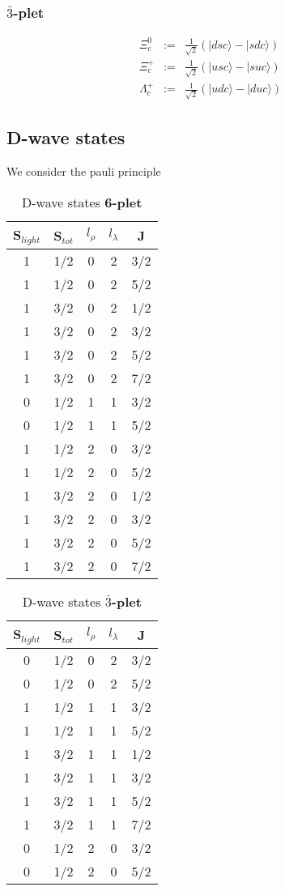\documentclass[twocolumn,superscriptaddress,preprintnumbers,nofootinbib]{revtex4}
\begin{document}
\subsubsection{\bf $\bar 3$-plet}
\begin{eqnarray}
\Xi^0_c&:=&\frac{1}{\sqrt{2}}(|dsc\rangle-|sdc\rangle)\\
\Xi^+_c&:=&\frac{1}{\sqrt{2}}(|usc\rangle-|suc\rangle)\\
\Lambda^+_c&:=&\frac{1}{\sqrt{2}}(|udc\rangle-|duc\rangle)
\end{eqnarray}
\subsection{D-wave states}
We consider the pauli principle  
\begin{table}[htbp]
\caption{D-wave states \bf 6-plet}
\begin{tabular}{ccccc}
\hline
\hline
S$_{light}$   &S$_{tot}$         &$l_{\rho}$        &$l_{\lambda}$         &J\\
\hline
1&1/2&0&2&3/2\\
1&1/2&0&2&5/2\\
1&3/2&0&2&1/2\\
1&3/2&0&2&3/2\\
1&3/2&0&2&5/2\\
1&3/2&0&2&7/2\\
0&1/2&1&1&3/2\\
0&1/2&1&1&5/2\\
1&1/2&2&0&3/2\\
1&1/2&2&0&5/2\\
1&3/2&2&0&1/2\\
1&3/2&2&0&3/2\\
1&3/2&2&0&5/2\\
1&3/2&2&0&7/2\\
\hline
\hline
\end{tabular}
\end{table}
\begin{table}[htbp]
\caption{D-wave states \bf $\bar3$-plet}
\begin{tabular}{ccccc}
\hline
\hline
S$_{light}$   &S$_{tot}$         &$l_{\rho}$        &$l_{\lambda}$         &J\\
\hline
0&1/2&0&2&3/2\\
0&1/2&0&2&5/2\\
1&1/2&1&1&3/2\\
1&1/2&1&1&5/2\\
1&3/2&1&1&1/2\\
1&3/2&1&1&3/2\\
1&3/2&1&1&5/2\\
1&3/2&1&1&7/2\\
0&1/2&2&0&3/2\\
0&1/2&2&0&5/2\\
\hline
\hline
\end{tabular}
\end{table}
\end{document}
